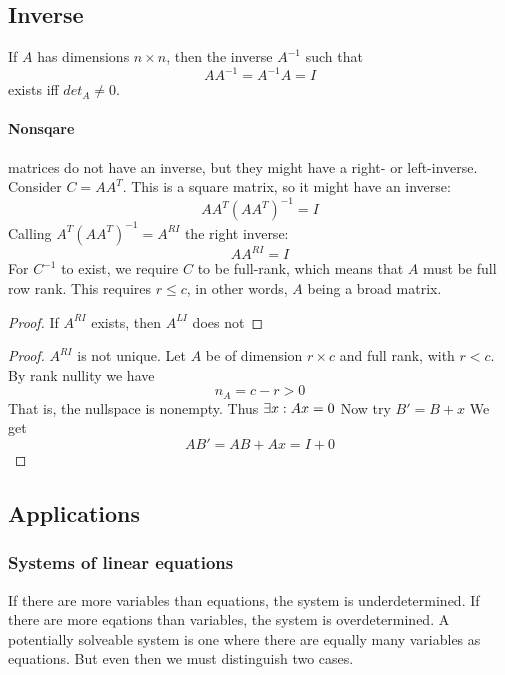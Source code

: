\subsection{Inverse}

If $A$ has dimensions $n \times n$, then the inverse $A^{-1}$ such that
$$ A A^{-1} = A^{-1} A = I $$
exists iff $det_A \neq 0$.

\paragraph{Nonsqare} matrices do not have an inverse, but they might have a right- or left-inverse.
Consider $C = A A^T$. This is a square matrix, so it might have an inverse:
$$ A A^T (A A^T)^{-1} = I $$
Calling $A^T (A A^T)^{-1} = A^{RI}$ the right inverse:
$$ A A^{RI} = I $$
For $C^{-1}$ to exist, we require $C$ to be full-rank, which means that $A$ must be full row rank. This  requires $r \leq c$, in other words, $A$ being a broad matrix.

\begin{proof}
If $A^{RI}$ exists, then $A^{LI}$ does not
\end{proof}

\begin{proof}
    $A^{RI}$ is not unique.
    Let $A$ be of dimension $r \times c$ and full rank, with $r < c$. By rank nullity we have
    $$ n_A = c - r > 0 $$
    That is, the nullspace is nonempty. Thus $\exists x : Ax = 0$
    Now try $B' = B + x$
    We get 
    $$ AB' = AB + Ax = I + 0$$
\end{proof}


















\subsection{Applications}


\subsubsection{Systems of linear equations}
If there are more variables than equations, the system is underdetermined. If there are more eqations than variables, the system is overdetermined. A potentially solveable system is one where there are equally many variables as equations. But even then we must distinguish two cases. 

